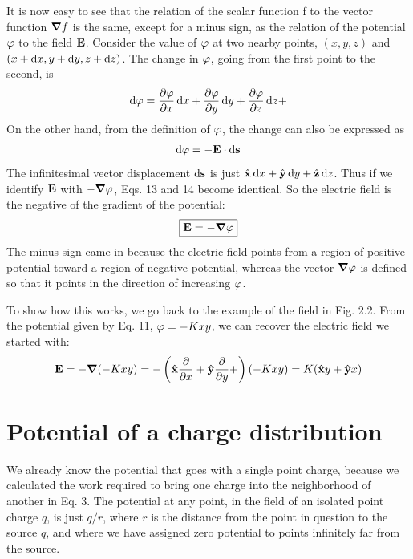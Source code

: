 It is now easy to see that the relation of the scalar function f to the
vector function $\boldsymbol{\nabla} f$ is the same, except for a minus sign, as the relation
of the potential $\varphi$ to the field $\mathbf{E}$. Consider the value of $\varphi$ at two nearby
points, $(x,y,z)$ and $(x + \operatorname{d\!} x, y + \operatorname{d\!} y, z + \operatorname{d\!} z)$. The change in $\varphi$, going
from the first point to the second, is
\begin{equation}
  \operatorname{d\!} \varphi = \frac{\partial\varphi}{\partial x} \operatorname{d\!} x 
            + \frac{\partial\varphi}{\partial y} \operatorname{d\!} y
            + \frac{\partial\varphi}{\partial z} \operatorname{d\!} z + 
\end{equation}
On the other hand, from the definition of $\varphi$, the change can also be
expressed as
\begin{equation}
  \operatorname{d\!}\varphi = -\mathbf{E}\cdot\operatorname{d\!}\mathbf{s}
\end{equation}
The infinitesimal vector displacement $\operatorname{d\!}\mathbf{s}$ is just $\hat{\mathbf{x}}\operatorname{d\!} x+\hat{\mathbf{y}}\operatorname{d\!} y+\hat{\mathbf{z}}\operatorname{d\!} z$.
Thus if we identify $\mathbf{E}$ with $-\boldsymbol{\nabla}\varphi$, Eqs. 13 and 14 become identical. So
the electric field is the negative of the gradient of the potential:
\begin{equation}
\boxed{
  \mathbf{E}=-\boldsymbol{\nabla}\varphi
}
\end{equation}
\noindent The minus sign came in because the electric field points from a region
of positive potential toward a region of negative potential, whereas
the vector $\boldsymbol{\nabla}\varphi$ is defined so that it points in the direction of increasing
$\varphi$.

To show how this works, we go back to the example of the field in
Fig. 2.2. From the potential given by Eq. 11, $\varphi = -Kxy$, we can
recover the electric field we started with:
\begin{equation}
  \mathbf{E} = -\boldsymbol{\nabla}(-Kxy)
         =-\left(\hat{\mathbf{x}}\frac{\partial}{\partial x}+\hat{\mathbf{y}}\frac{\partial}{\partial y}+\right)(-Kxy)
         =K(\hat{\mathbf{x}} y+\hat{\mathbf{y}} x)
\end{equation}

\section{Potential of a charge distribution}

We already know the potential that goes with a single point charge,
because we calculated the work required to bring one charge into the
neighborhood of another in Eq. 3. The potential at any point, in the
field of an isolated point charge $q$, is just $q/r$, where $r$ is the distance
from the point in question to the source $q$, and where we have
assigned zero potential to points infinitely far from the source.

